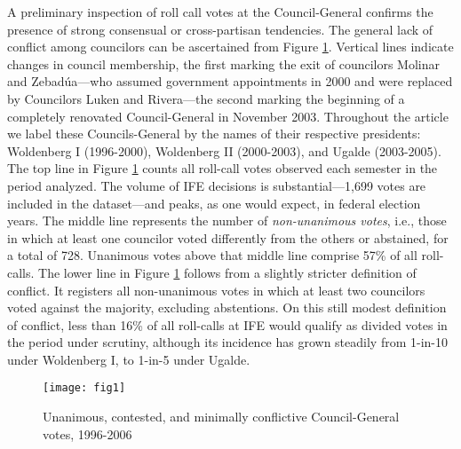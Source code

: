 \documentclass[12 pt, letter]{article}
\begin{document}
A preliminary inspection of roll call votes at the Council-General
confirms the presence of strong consensual or cross-partisan
tendencies.  The general lack of conflict among councilors can be
ascertained from Figure \ref{F:unan}.  Vertical lines indicate
changes in council membership, the first marking the exit of
councilors Molinar and Zebad\'ua---who assumed government
appointments in 2000 and were replaced by Councilors Luken and
Rivera---the second marking the beginning of a completely renovated
Council-General in November 2003.  Throughout the article we label
these Councils-General by the names of their respective presidents:
Woldenberg I (1996-2000), Woldenberg II (2000-2003), and Ugalde
(2003-2005).  The top line in Figure \ref{F:unan} counts all
roll-call votes observed each semester in the period analyzed.  The
volume of IFE decisions is substantial---1,699 votes are included in
the dataset---and peaks, as one would expect, in federal election
years.  The middle line represents the number of \emph{non-unanimous
votes}, i.e., those in which at least one councilor voted
differently from the others or abstained, for a total of 728.
Unanimous votes above that middle line comprise 57\% of all
roll-calls. The lower line in Figure \ref{F:unan} follows from a
slightly stricter definition of conflict.  It registers all
non-unanimous votes in which at least two councilors voted against
the majority, excluding abstentions.  On this still modest
definition of conflict, less than 16\% of all roll-calls at IFE
would qualify as divided votes in the period under scrutiny,
although its incidence has grown steadily from 1-in-10 under
Woldenberg I, to 1-in-5 under Ugalde.

\begin{figure}
\begin{center}
   \caption{Unanimous, contested, and minimally conflictive Council-General votes, 1996-2006}\label{F:unan}
   \texttt{[image: fig1]}
\end{center}
\end{figure}
\end{document}
